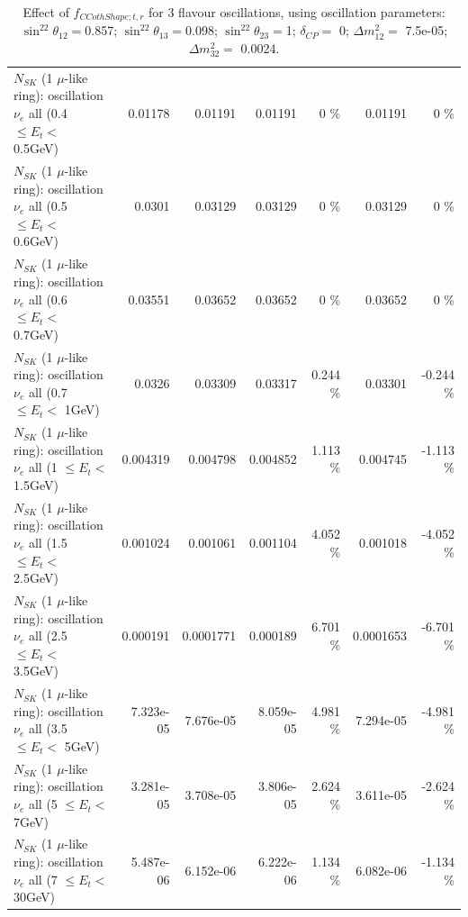 \begin{table}
\begin{tabular}{| l | r | r | r  r | r  r |}
$N_{SK}$ (1 $\mu$-like ring): oscillation $\nu_{e}$ all (0.4 $\leq E_{t} <$ 0.5GeV) &         0.01178 &         0.01191 &         0.01191 &        0 \%  &         0.01191 &        0 \%  \\ 
$N_{SK}$ (1 $\mu$-like ring): oscillation $\nu_{e}$ all (0.5 $\leq E_{t} <$ 0.6GeV) &          0.0301 &         0.03129 &         0.03129 &        0 \%  &         0.03129 &        0 \%  \\ 
$N_{SK}$ (1 $\mu$-like ring): oscillation $\nu_{e}$ all (0.6 $\leq E_{t} <$ 0.7GeV) &         0.03551 &         0.03652 &         0.03652 &        0 \%  &         0.03652 &        0 \%  \\ 
$N_{SK}$ (1 $\mu$-like ring): oscillation $\nu_{e}$ all (0.7 $\leq E_{t} <$ 1GeV) &          0.0326 &         0.03309 &         0.03317 &    0.244 \%  &         0.03301 &   -0.244 \%  \\ 
$N_{SK}$ (1 $\mu$-like ring): oscillation $\nu_{e}$ all (1 $\leq E_{t} <$ 1.5GeV) &        0.004319 &        0.004798 &        0.004852 &    1.113 \%  &        0.004745 &   -1.113 \%  \\ 
$N_{SK}$ (1 $\mu$-like ring): oscillation $\nu_{e}$ all (1.5 $\leq E_{t} <$ 2.5GeV) &        0.001024 &        0.001061 &        0.001104 &    4.052 \%  &        0.001018 &   -4.052 \%  \\ 
$N_{SK}$ (1 $\mu$-like ring): oscillation $\nu_{e}$ all (2.5 $\leq E_{t} <$ 3.5GeV) &        0.000191 &       0.0001771 &        0.000189 &    6.701 \%  &       0.0001653 &   -6.701 \%  \\ 
$N_{SK}$ (1 $\mu$-like ring): oscillation $\nu_{e}$ all (3.5 $\leq E_{t} <$ 5GeV) &       7.323e-05 &       7.676e-05 &       8.059e-05 &    4.981 \%  &       7.294e-05 &   -4.981 \%  \\ 
 $N_{SK}$ (1 $\mu$-like ring): oscillation $\nu_{e}$ all (5 $\leq E_{t} <$ 7GeV) &       3.281e-05 &       3.708e-05 &       3.806e-05 &    2.624 \%  &       3.611e-05 &   -2.624 \%  \\ 
$N_{SK}$ (1 $\mu$-like ring): oscillation $\nu_{e}$ all (7 $\leq E_{t} <$ 30GeV) &       5.487e-06 &       6.152e-06 &       6.222e-06 &    1.134 \%  &       6.082e-06 &   -1.134 \%  \\ 
\hline
\hline
\end{tabular}
\caption{ Effect of $f_{CCothShape; t, r}$ for 3 flavour oscillations, using oscillation parameters:  $\sin^22\theta_{12} = $0.857; $\sin^22\theta_{13} = $0.098; $\sin^22\theta_{23} = $1; $\delta_{CP} = $        0; $\Delta m^2_{12} = $    7.5e-05; $\Delta m^2_{32} = $    0.0024. }
\label{tab:num_xsec_shape_ccoth_1RmuT_3f_osc_t13:0.098}
\end{table}
